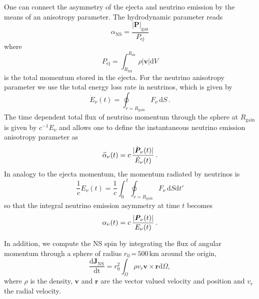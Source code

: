 \documentclass[fleqn,usenatbib]{mnras}
\newcommand{\ud}{\ensuremath{\mathrm{d}}\xspace}
\newcommand{\km}{\ensuremath{\mathrm{km}}}
\begin{document}
One can connect the asymmetry of the ejecta and neutrino emission by the means of an anisotropy parameter. The hydrodynamic parameter reads 
\begin{equation}
    \alpha_{\mathrm{NS}} = \frac{|\mathbf{P}|_{\mathrm{gas}}}{P_{\mathrm{ej}}}
\end{equation}
where 
\begin{equation}
P_{\mathrm{ej}}=\int_{R_{\mathrm{NS}}}^{R_{\mathrm{sh}}}\rho |\mathbf{v}| \ud V
\end{equation}
is the total momentum stored in the ejecta.
For the neutrino anisotropy parameter we use 
the total energy loss rate in neutrinos, which is given by
\begin{equation}
\label{nuerg}
\dot{E}_\nu (t) = \oint_{r = R_\mathrm{gain}} F_{\!\nu}\, \ud S\,.
\end{equation}
The time dependent total flux of neutrino momentum through the sphere at 
$R_\mathrm{gain}$ is given by $c^{-1}E_\nu$ and allows one to define the
instantaneous neutrino emission anisotropy parameter as
\begin{equation}
\label{nuanis}
{\widetilde\alpha}_\nu (t) = 
c\,\frac{|\dot{\textit{\textbf{P}}}_{\nu}(t)|}{\dot{E}_\nu(t)}\,.
\end{equation}
In analogy to the ejecta momentum, the momentum radiated by neutrinos is
\begin{equation}
\label{pnu}
\frac{1}{c} E_\nu (t)
= \frac{1}{c}\int_0^{\, t} \oint_{r = R_\mathrm{gain}}F_{\!\nu}\, \ud S \mathrm{d}t'
\end{equation}
so that the integral neutrino emission asymmetry at time $t$ becomes
\begin{equation}
\label{anu}
\alpha_\nu (t) = c\,\frac{|{\textit{\textbf{P}}}_{\nu}(t)|}{E_\nu(t)}\,.
\end{equation}


In addition, we compute the NS spin by integrating the flux of angular momentum through a sphere of radius $r_0\,\mathord{=}\,500\,\km$ around the origin,
\begin{equation}
    \label{equ:jns}
    \frac{\mathrm{d}\mathbf{J}_{\mathrm{NS}}}{\mathrm{dt}} = r_0^2\int_{\Omega} \rho v_r \mathbf{v}\times \mathbf{r} \mathrm{d}\Omega,
\end{equation}
where $\rho$ is the density, $\mathbf{v}$ and $\mathbf{r}$ are the vector valued velocity and position and $v_r$ the radial velocity.
\end{document}
